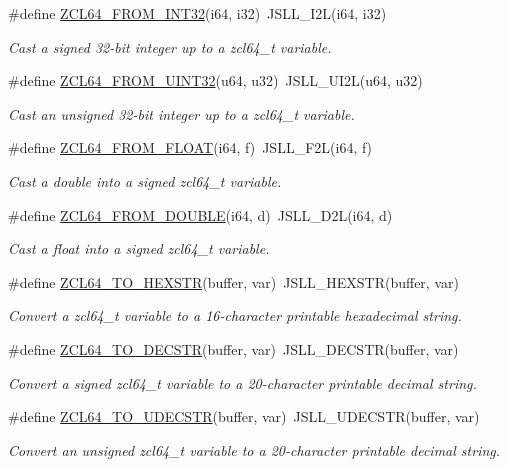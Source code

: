 \begin{DoxyCompactItemize}
$$\#define \hyperlink{group__zcl__64_gafe6c7cf76cbba5ac7fb5329fd0801278}{Z\+C\+L64\+\_\+\+F\+R\+O\+M\+\_\+\+I\+N\+T32}(i64,  i32)~J\+S\+L\+L\+\_\+\+I2L(i64, i32)
\begin{DoxyCompactList}\small\item\em Cast a signed 32-\/bit integer up to a zcl64\+\_\+t variable. \end{DoxyCompactList}\item 
\#define \hyperlink{group__zcl__64_gaae113edcbf898afca39e88d742c27f8d}{Z\+C\+L64\+\_\+\+F\+R\+O\+M\+\_\+\+U\+I\+N\+T32}(u64,  u32)~J\+S\+L\+L\+\_\+\+U\+I2L(u64, u32)
\begin{DoxyCompactList}\small\item\em Cast an unsigned 32-\/bit integer up to a zcl64\+\_\+t variable. \end{DoxyCompactList}\item 
\#define \hyperlink{group__zcl__64_gaae1ff05a93a54da4e06bbca682d2c548}{Z\+C\+L64\+\_\+\+F\+R\+O\+M\+\_\+\+F\+L\+O\+AT}(i64,  f)~J\+S\+L\+L\+\_\+\+F2L(i64, f)
\begin{DoxyCompactList}\small\item\em Cast a {\ttfamily double} into a signed zcl64\+\_\+t variable. \end{DoxyCompactList}\item 
\#define \hyperlink{group__zcl__64_ga1899e4fdd99e7f07bf5044997a40e248}{Z\+C\+L64\+\_\+\+F\+R\+O\+M\+\_\+\+D\+O\+U\+B\+LE}(i64,  d)~J\+S\+L\+L\+\_\+\+D2L(i64, d)
\begin{DoxyCompactList}\small\item\em Cast a {\ttfamily float} into a signed zcl64\+\_\+t variable. \end{DoxyCompactList}\item 
\#define \hyperlink{group__zcl__64_ga24b0de907d96815f51558733e99792d3}{Z\+C\+L64\+\_\+\+T\+O\+\_\+\+H\+E\+X\+S\+TR}(buffer,  var)~J\+S\+L\+L\+\_\+\+H\+E\+X\+S\+TR(buffer, var)
\begin{DoxyCompactList}\small\item\em Convert a zcl64\+\_\+t variable to a 16-\/character printable hexadecimal string. \end{DoxyCompactList}\item 
\#define \hyperlink{group__zcl__64_gae93bf21431b64dcc3d9bcd67296ff0ed}{Z\+C\+L64\+\_\+\+T\+O\+\_\+\+D\+E\+C\+S\+TR}(buffer,  var)~J\+S\+L\+L\+\_\+\+D\+E\+C\+S\+TR(buffer, var)
\begin{DoxyCompactList}\small\item\em Convert a signed zcl64\+\_\+t variable to a 20-\/character printable decimal string. \end{DoxyCompactList}\item 
\#define \hyperlink{group__zcl__64_gae094f7c19dcfd18917b426a9e43aa427}{Z\+C\+L64\+\_\+\+T\+O\+\_\+\+U\+D\+E\+C\+S\+TR}(buffer,  var)~J\+S\+L\+L\+\_\+\+U\+D\+E\+C\+S\+TR(buffer, var)
\begin{DoxyCompactList}\small\item\em Convert an unsigned zcl64\+\_\+t variable to a 20-\/character printable decimal string. \end{DoxyCompactList}\end{DoxyCompactItemize}

